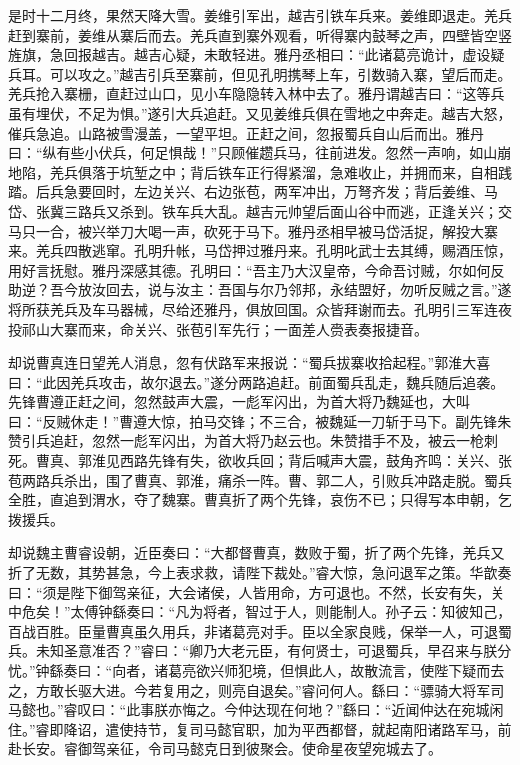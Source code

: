 是时十二月终，果然天降大雪。姜维引军出，越吉引铁车兵来。姜维即退走。羌兵赶到寨前，姜维从寨后而去。羌兵直到寨外观看，听得寨内鼓琴之声，四壁皆空竖旌旗，急回报越吉。越吉心疑，未敢轻进。雅丹丞相曰：“此诸葛亮诡计，虚设疑兵耳。可以攻之。”越吉引兵至寨前，但见孔明携琴上车，引数骑入寨，望后而走。羌兵抢入寨栅，直赶过山口，见小车隐隐转入林中去了。雅丹谓越吉曰：“这等兵虽有埋伏，不足为惧。”遂引大兵追赶。又见姜维兵俱在雪地之中奔走。越吉大怒，催兵急追。山路被雪漫盖，一望平坦。正赶之间，忽报蜀兵自山后而出。雅丹曰：“纵有些小伏兵，何足惧哉！”只顾催趱兵马，往前进发。忽然一声响，如山崩地陷，羌兵俱落于坑堑之中；背后铁车正行得紧溜，急难收止，并拥而来，自相践踏。后兵急要回时，左边关兴、右边张苞，两军冲出，万弩齐发；背后姜维、马岱、张冀三路兵又杀到。铁车兵大乱。越吉元帅望后面山谷中而逃，正逢关兴；交马只一合，被兴举刀大喝一声，砍死于马下。雅丹丞相早被马岱活捉，解投大寨来。羌兵四散逃窜。孔明升帐，马岱押过雅丹来。孔明叱武士去其缚，赐酒压惊，用好言抚慰。雅丹深感其德。孔明曰：“吾主乃大汉皇帝，今命吾讨贼，尔如何反助逆？吾今放汝回去，说与汝主：吾国与尔乃邻邦，永结盟好，勿听反贼之言。”遂将所获羌兵及车马器械，尽给还雅丹，俱放回国。众皆拜谢而去。孔明引三军连夜投祁山大寨而来，命关兴、张苞引军先行；一面差人赍表奏报捷音。

却说曹真连日望羌人消息，忽有伏路军来报说：“蜀兵拔寨收拾起程。”郭淮大喜曰：“此因羌兵攻击，故尔退去。”遂分两路追赶。前面蜀兵乱走，魏兵随后追袭。先锋曹遵正赶之间，忽然鼓声大震，一彪军闪出，为首大将乃魏延也，大叫曰：“反贼休走！”曹遵大惊，拍马交锋；不三合，被魏延一刀斩于马下。副先锋朱赞引兵追赶，忽然一彪军闪出，为首大将乃赵云也。朱赞措手不及，被云一枪刺死。曹真、郭淮见西路先锋有失，欲收兵回；背后喊声大震，鼓角齐鸣：关兴、张苞两路兵杀出，围了曹真、郭淮，痛杀一阵。曹、郭二人，引败兵冲路走脱。蜀兵全胜，直追到渭水，夺了魏寨。曹真折了两个先锋，哀伤不已；只得写本申朝，乞拨援兵。

却说魏主曹睿设朝，近臣奏曰：“大都督曹真，数败于蜀，折了两个先锋，羌兵又折了无数，其势甚急，今上表求救，请陛下裁处。”睿大惊，急问退军之策。华歆奏曰：“须是陛下御驾亲征，大会诸侯，人皆用命，方可退也。不然，长安有失，关中危矣！”太傅钟繇奏曰：“凡为将者，智过于人，则能制人。孙子云：知彼知己，百战百胜。臣量曹真虽久用兵，非诸葛亮对手。臣以全家良贱，保举一人，可退蜀兵。未知圣意准否？”睿曰：“卿乃大老元臣，有何贤士，可退蜀兵，早召来与朕分忧。”钟繇奏曰：“向者，诸葛亮欲兴师犯境，但惧此人，故散流言，使陛下疑而去之，方敢长驱大进。今若复用之，则亮自退矣。”睿问何人。繇曰：“骠骑大将军司马懿也。”睿叹曰：“此事朕亦悔之。今仲达现在何地？”繇曰：“近闻仲达在宛城闲住。”睿即降诏，遣使持节，复司马懿官职，加为平西都督，就起南阳诸路军马，前赴长安。睿御驾亲征，令司马懿克日到彼聚会。使命星夜望宛城去了。

